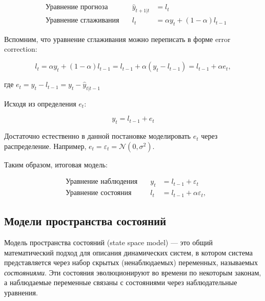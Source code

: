 \documentclass[12pt,fleqn]{article}
\begin{document}
\begin{equation}
  \begin{array}{llll}
    &\text{Уравнение прогноза} \quad &   \hat{y}_{t+1|t} & = l_t \\
    &\text{Уравнение сглаживания}\quad & l_t & =\alpha y_t +(1-\alpha) l_{t-1}
  \end{array}
  \label{eq:deterministic_ets}
\end{equation}

Вспомним, что уравнение сглаживания можно переписать в форме error correction:

\begin{equation}
  l_t = \alpha y_t +(1-\alpha) l_{t-1} =  l_{t-1}  + \alpha (y_t - l_{t-1}) =  l_{t-1}  + \alpha e_t,
\end{equation}

где $e_t = y_t - l_{t-1} = y_t - \hat{y}_{t|t-1}$

Исходя из определения $e_t$:

\begin{equation}
  y_t = l_{t-1} + e_t
\end{equation}

Достаточно естественно в данной постановке моделировать $e_t$ через распределение.
Например, $e_t = \varepsilon_t = \mathcal{N}(0, \sigma^2)$.

Таким образом, итоговая модель:

\begin{equation}
  \begin{array}{llll}
    &\text{Уравнение наблюдения} \quad &   y_t & = l_{t-1} + \varepsilon_t \\
    &\text{Уравнение состояния}\quad & l_t & = l_{t-1}  + \alpha \varepsilon_t,
  \end{array}
  \label{eq:stochastic_ets}
\end{equation}

\subsection{Модели пространства состояний}

Модель пространства состояний (state space model) — это общий математический подход для описания динамических систем, в котором система представляется через набор скрытых (ненаблюдаемых) переменных, называемых \textit{состояниями}.
Эти состояния эволюционируют во времени по некоторым законам, а наблюдаемые переменные связаны с состояниями через наблюдательные уравнения.
\end{document}

